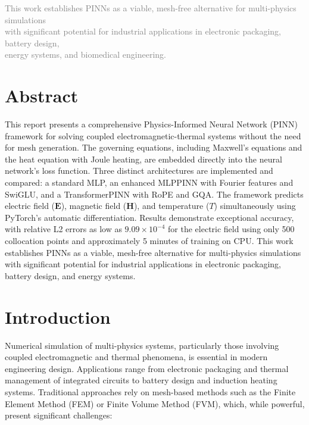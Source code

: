 \documentclass[11pt,a4paper]{article}
\begin{document}
\vspace{1cm}
\begin{center}
    {\small\textcolor{gray}{This work establishes PINNs as a viable, mesh-free alternative for multi-physics simulations\\with significant potential for industrial applications in electronic packaging, battery design,\\energy systems, and biomedical engineering.}}
\end{center}

\newpage

\tableofcontents
\newpage

\setcounter{page}{1}

\section{Abstract}

This report presents a comprehensive Physics-Informed Neural Network (PINN) framework for solving coupled electromagnetic-thermal systems without the need for mesh generation. The governing equations, including Maxwell's equations and the heat equation with Joule heating, are embedded directly into the neural network's loss function. Three distinct architectures are implemented and compared: a standard MLP, an enhanced MLPPINN with Fourier features and SwiGLU, and a TransformerPINN with RoPE and GQA. The framework predicts electric field ($\mathbf{E}$), magnetic field ($\mathbf{H}$), and temperature ($T$) simultaneously using PyTorch's automatic differentiation. Results demonstrate exceptional accuracy, with relative L2 errors as low as $9.09 \times 10^{-4}$ for the electric field using only 500 collocation points and approximately 5 minutes of training on CPU. This work establishes PINNs as a viable, mesh-free alternative for multi-physics simulations with significant potential for industrial applications in electronic packaging, battery design, and energy systems.

\section{Introduction}

Numerical simulation of multi-physics systems, particularly those involving coupled electromagnetic and thermal phenomena, is essential in modern engineering design. Applications range from electronic packaging and thermal management of integrated circuits to battery design and induction heating systems. Traditional approaches rely on mesh-based methods such as the Finite Element Method (FEM) or Finite Volume Method (FVM), which, while powerful, present significant challenges:
\end{document}
